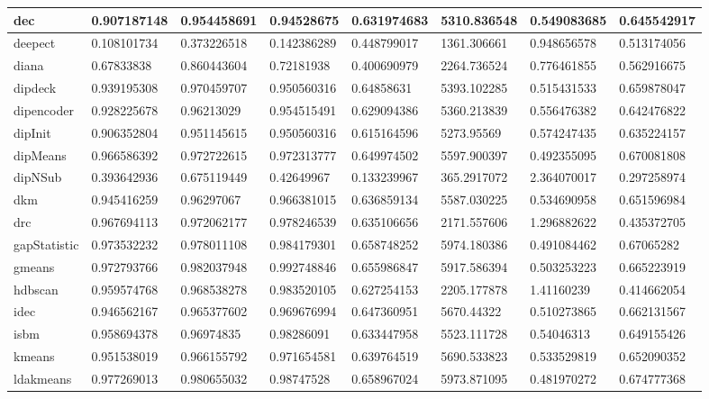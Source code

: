 \begin{table}[H]
\begin{tabular}{|l|l|l|l|l|l|l|l|}
\hline
dec & 0.907187148 & 0.954458691 & 0.94528675 & 0.631974683 & 5310.836548 & 0.549083685 & 0.645542917 \\
\hline
deepect & 0.108101734 & 0.373226518 & 0.142386289 & 0.448799017 & 1361.306661 & 0.948656578 & 0.513174056 \\
\hline
diana & 0.67833838 & 0.860443604 & 0.72181938 & 0.400690979 & 2264.736524 & 0.776461855 & 0.562916675 \\
\hline
dipdeck & 0.939195308 & 0.970459707 & 0.950560316 & 0.64858631 & 5393.102285 & 0.515431533 & 0.659878047 \\
\hline
dipencoder & 0.928225678 & 0.96213029 & 0.954515491 & 0.629094386 & 5360.213839 & 0.556476382 & 0.642476822 \\
\hline
dipInit & 0.906352804 & 0.951145615 & 0.950560316 & 0.615164596 & 5273.95569 & 0.574247435 & 0.635224157 \\
\hline
dipMeans & 0.966586392 & 0.972722615 & 0.972313777 & 0.649974502 & 5597.900397 & 0.492355095 & 0.670081808 \\
\hline
dipNSub & 0.393642936 & 0.675119449 & 0.42649967 & 0.133239967 & 365.2917072 & 2.364070017 & 0.297258974 \\
\hline
dkm & 0.945416259 & 0.96297067 & 0.966381015 & 0.636859134 & 5587.030225 & 0.534690958 & 0.651596984 \\
\hline
drc & 0.967694113 & 0.972062177 & 0.978246539 & 0.635106656 & 2171.557606 & 1.296882622 & 0.435372705 \\
\hline
gapStatistic & 0.973532232 & 0.978011108 & 0.984179301 & 0.658748252 & 5974.180386 & 0.491084462 & 0.67065282 \\
\hline
gmeans & 0.972793766 & 0.982037948 & 0.992748846 & 0.655986847 & 5917.586394 & 0.503253223 & 0.665223919 \\
\hline
hdbscan & 0.959574768 & 0.968538278 & 0.983520105 & 0.627254153 & 2205.177878 & 1.41160239 & 0.414662054 \\
\hline
idec & 0.946562167 & 0.965377602 & 0.969676994 & 0.647360951 & 5670.44322 & 0.510273865 & 0.662131567 \\
\hline
isbm & 0.958694378 & 0.96974835 & 0.98286091 & 0.633447958 & 5523.111728 & 0.54046313 & 0.649155426 \\
\hline
kmeans & 0.951538019 & 0.966155792 & 0.971654581 & 0.639764519 & 5690.533823 & 0.533529819 & 0.652090352 \\
\hline
ldakmeans & 0.977269013 & 0.980655032 & 0.98747528 & 0.658967024 & 5973.871095 & 0.481970272 & 0.674777368 \\

\end{tabular}
\end{table}
